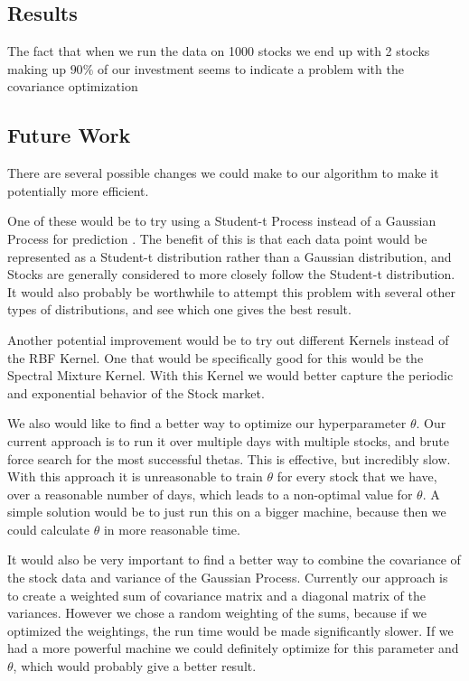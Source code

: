 \documentclass{article}
\begin{document}
\subsection{Results}

The fact that when we run the data on 1000 stocks we end up with 2 stocks making up $90\%$ of our investment seems to indicate a problem with the covariance optimization 

\subsection{Future Work}

There are several possible changes we could make to our algorithm to make it potentially more efficient.  

One of these would be to try using a Student-t Process instead of a Gaussian Process for prediction \cite{student-t}.  The benefit of this is that each data point would be represented as a Student-t distribution rather than a Gaussian distribution, and Stocks are generally considered to more closely follow the Student-t distribution.  It would also probably be worthwhile to attempt this problem with several other types of distributions, and see which one gives the best result.  

Another potential improvement would be to try out different Kernels instead of the RBF Kernel.  One that would be specifically good for this would be the Spectral Mixture Kernel. \cite{spectral} With this Kernel we would better capture the periodic and exponential behavior of the Stock market.

We also would like to find a better way to optimize our hyperparameter $\theta$.  Our current approach is to run it over multiple days with multiple stocks, and brute force search for the most successful thetas.  This is effective, but incredibly slow.  With this approach it is unreasonable to train $\theta$ for every stock that we have, over a reasonable number of days, which leads to a non-optimal value for $\theta$.  A simple solution would be to just run this on a bigger machine, because then we could calculate $\theta$ in more reasonable time. 

It would also be very important to find a better way to combine the covariance of the stock data and variance of the Gaussian Process.  Currently our approach is to create a weighted sum of covariance matrix and a diagonal matrix of the variances. However we chose a random weighting of the sums, because if we optimized the weightings, the run time would be made significantly slower. If we had a more powerful machine we could definitely optimize for this parameter and $\theta$, which would probably give a better result.





\end{document}
